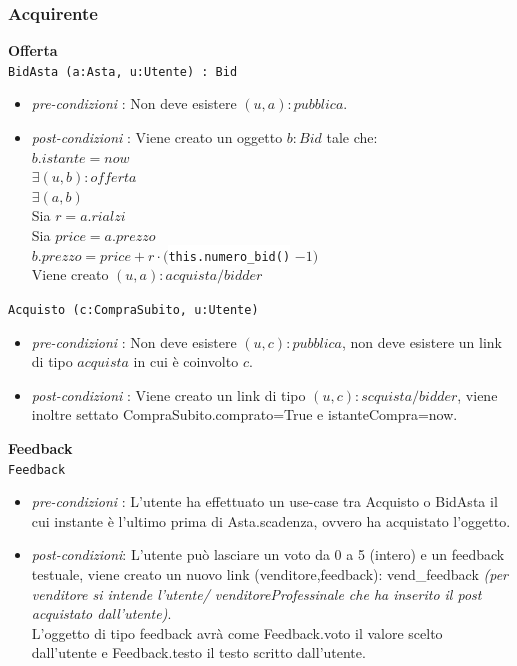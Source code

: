 \documentclass[12pt, letterpaper]{article}
\newcommand{\code}[1]{\colorbox{light-gray}{\texttt{#1}}}
\newcommand{\codee}[1]{\colorbox{white}{\texttt{#1}}}
\begin{document}
\subsubsection{Acquirente}
\textbf{Offerta}\\
\code{BidAsta (a:Asta, u:Utente) :  Bid }\begin{itemize}
    \item \textit{pre-condizioni} : Non deve esistere $(u,a):pubblica$. 
    \item \textit{post-condizioni} : Viene creato un oggetto $b:Bid$ tale che:\\ 
     $b.istante=now$ \\
     $\exists (u,b) : offerta$ \\
     $\exists (a,b) $ \\ 
     Sia $r=a.rialzi$\\ 
     Sia $price=a.prezzo$\\
     $b.prezzo = price + r\cdot ($\codee{this.numero\_bid()} $-1 )$\\
     Viene creato $(u,a):acquista/bidder$ 
\end{itemize}
\code{Acquisto (c:CompraSubito, u:Utente) }\begin{itemize}
    \item \textit{pre-condizioni} : Non deve esistere $(u,c):pubblica$, non deve 
    esistere un link di tipo $acquista$ in cui è coinvolto $c$. 
    \item \textit{post-condizioni} : Viene creato un link di tipo $(u,c):scquista/bidder$, viene inoltre settato CompraSubito.comprato=True e istanteCompra=now.\\
\end{itemize}

\textbf{Feedback}\\
\code{Feedback}\begin{itemize}
    \item \textit{pre-condizioni} : L'utente ha effettuato un use-case tra Acquisto o  BidAsta il cui instante è l'ultimo prima di Asta.scadenza, ovvero ha acquistato l'oggetto.
    \item \textit{post-condizioni}: L'utente può lasciare un voto da 0 a 5 (intero) e un feedback testuale, viene creato un nuovo link (venditore,feedback): vend\_feedback \textit{(per venditore si intende l'utente/ venditoreProfessinale che ha inserito il post acquistato dall'utente)}.\\
    L'oggetto di tipo feedback avrà come Feedback.voto il valore scelto dall'utente e Feedback.testo il testo scritto dall'utente.
\end{itemize}
\end{document}
